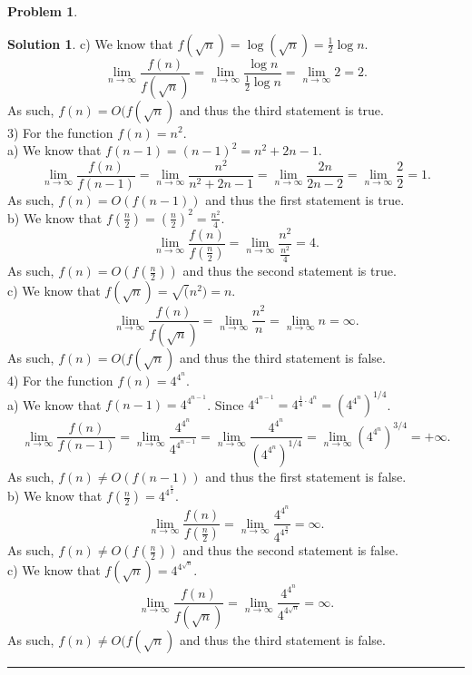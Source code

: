 \documentclass{article}
\theoremstyle{definition}
\newtheorem{problem}{Problem}
\def\fline{\rule{0.75\linewidth}{0.5pt}}
\newcommand{\finishline}{\begin{center}\fline\end{center}}
\newtheorem*{solution*}{Solution}
\newenvironment{solution}{\begin{solution*}}{{\finishline} \end{solution*}}
\begin{document}
\begin{problem}
\begin{solution}
		c) We know that $f(\sqrt n) = \log(\sqrt n) = \frac{1}{2} \log n$. 
	 	\[
			\lim_{n \to \infty}\frac{f(n)}{f(\sqrt n)} = \lim_{n \to \infty}\frac{\log n}{\frac{1}{2} \log n} = \lim_{n \to \infty}2 = 2.
		\]	
			As such, $f(n) = O(f(\sqrt n)$ and thus the third statement is true. \\ 
		
		
	 3) For the function $f(n) =  n^2$. \\
	 
	 a) We know that $f(n-1) = (n -1)^2 = n^2 + 2n -1$. 
	 \[
		\lim_{n \to \infty}\frac{f(n)}{f(n-1)} = \lim_{n \to \infty}\frac{n^2}{n^2 + 2n -1} = \lim_{n \to \infty}\frac{2n}{2n - 2} = \lim_{n \to \infty}\frac{2}{2} = 1.
	\]	
		As such, $f(n) = O(f(n-1))$ and thus the first statement is true. \\
		
	b) We know that $f(\frac{n}{2}) = (\frac{n}{2})^2 = \frac{n^2}{4} $. 
	 	\[
			\lim_{n \to \infty}\frac{f(n)}{f(\frac{n}{2})} = \lim_{n \to \infty}\frac{n^2}{\frac{n^2}{4}} = 4.
		\]	
			As such, $f(n) = O(f(\frac{n}{2}))$ and thus the second statement is true. \\ 
		
	c) We know that $f(\sqrt n) = \sqrt(n^2) = n$. 
	 	\[
			\lim_{n \to \infty}\frac{f(n)}{f(\sqrt n)} = \lim_{n \to \infty}\frac{n^2}{n} = \lim_{n \to \infty}n = \infty.
		\]	
			As such, $f(n) = O(f(\sqrt n)$ and thus the third statement is false. \\ 
	 
	 4) For the function $f(n) = 4^{4^n}$. \\ 
	  
	 a) We know that  $f(n-1) = 4^{4^{n-1}}$.  Since $4^{4^{n-1}}= 4^{\frac{1}{4} \cdot 4^n} = (4^{4^{n}})^{1/4}$.
	\[
		\lim_{n \to \infty}\frac{f(n)}{f(n-1)} = \lim_{n \to \infty}\frac{4^{4^{n}}}{4^{4^{n-1}}} = \lim_{n \to \infty}\frac{4^{4^{n}}}{(4^{4^{n}})^{1/4}} = \lim_{n \to \infty}(4^{4^{n}})^{3/4} = +\infty.
	\]	
		As such, $f(n) \neq O(f(n-1))$ and thus the first statement is false. \\
		
	b) We know that $f(\frac{n}{2}) = 4^{4^{\frac{n}{2}}}$.
	 \[
		\lim_{n \to \infty}\frac{f(n)}{f(\frac{n}{2})} = \lim_{n \to \infty}\frac{4^{4^n}}{4^{4^{\frac{n}{2}}}} = \infty.
	\]	
		As such, $f(n) \neq O(f(\frac{n}{2}))$ and thus the second statement is false. \\ 
		
	c) We know that $f(\sqrt n) = 4^{4^{\sqrt n}}$.
	 \[
		\lim_{n \to \infty}\frac{f(n)}{f(\sqrt n)} = \lim_{n \to \infty}\frac{4^{4^n}}{4^{4^{\sqrt n}}} = \infty.
	\]	
		As such, $f(n) \neq O(f(\sqrt n)$ and thus the third statement is false. \\ 
	 

\end{solution}
\end{problem}
\end{document}
